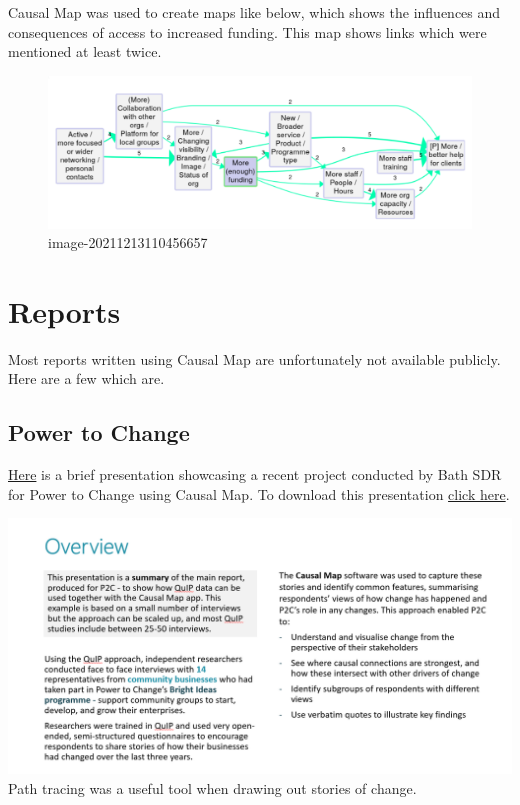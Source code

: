 \documentclass[
]{book}
\begin{document}
Causal Map was used to create maps like below, which shows the influences and consequences of access to increased funding. This map shows links which were mentioned at least twice.

\begin{figure}
\centering
\includegraphics[width=6.77083in,height=\textheight]{_assets/image-20211213110456657.png}
\caption{image-20211213110456657}
\end{figure}

\hypertarget{reports}{%
\section{Reports}\label{reports}}

Most reports written using Causal Map are unfortunately not available publicly. Here are a few which are.

\hypertarget{power-to-change}{%
\subsection{Power to Change}\label{power-to-change}}

\href{https://docs.google.com/file/d/1-QRmWwzctRYVowP7hD7buaGkQim8-0zq/view}{Here} is a brief presentation showcasing a recent project conducted by Bath SDR for Power to Change using Causal Map. To download this presentation \href{https://docs.google.com/presentation/d//export/pptx}{click here}.

\includegraphics{_assets/de1f66536036d0c064f913bf0cabe84e.png}
Path tracing was a useful tool when drawing out stories of change.
\end{document}
